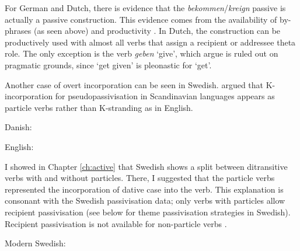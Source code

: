 For German and Dutch, there is evidence that the \textit{bekommen}/\textit{kreign} passive is actually a passive construction. This evidence comes from the availability of by-phrases (as seen above) and productivity \citep{Broekhuis.1994}. In Dutch, the construction can be productively used with almost all verbs that assign a recipient or addressee theta role. The only exception is the verb \textit{geben} `give', which \cite{Broekhuis.1994} argue is ruled out on pragmatic grounds, since `get given' is pleonastic for `get'.

Another case of overt incorporation can be seen in Swedish. \cite{Hersulnd.1984} argued that K-incorporation for pseudopassivisation in Scandinavian languages appears as particle verbs rather than K-stranding as in English. 

\begin{exe}
	\ex Danish:
	\begin{xlist}
	\end{xlist}
	\ex English: 
	\begin{xlist}
		\ex[*]{The bed was inslept.}
		\ex[ ]{The bed was slept in.}
\end{xlist}
\end{exe}

I showed in Chapter \ref{ch:active} that Swedish shows a split between ditransitive verbs with and without particles. There, I suggested that the particle verbs represented the incorporation of dative case into the verb. This explanation is consonant with the Swedish passivisation data; only verbs with particles allow recipient passivisation (see below for theme passivisation strategies in Swedish). Recipient passivisation is not available for non-particle verbs \citep{Lundquist.2006}.

\begin{exe}
	\ex Modern Swedish:
	\begin{xlist}
\end{xlist}	
\end{exe}


